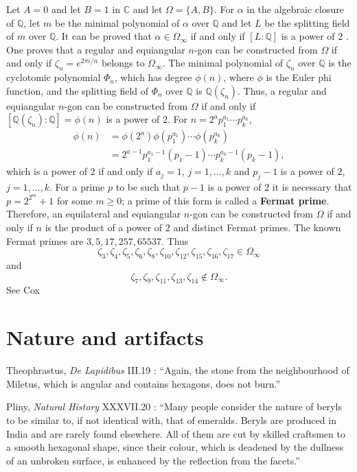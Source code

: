 \documentclass{article}
\begin{document}
Let $A=0$ and let $B=1$ in $\mathbb{C}$ and let $\Omega=\{A,B\}$. 
For $\alpha$ in the algebraic closure of $\mathbb{Q}$, let $m$ be the minimal polynomial of $\alpha$ over $\mathbb{Q}$ and let
$L$ be the splitting field of $m$ over $\mathbb{Q}$. 
It can be proved that
$\alpha \in \Omega_\infty$ if and only if $[L:\mathbb{Q}]$ is a power of $2$ \cite[p.~263, Theorem 10.1.12]{cox}.
One proves that a 
regular and equiangular $n$-gon can be constructed from $\Omega$ if and only if
$\zeta_n=e^{2\pi i/n}$ belongs to $\Omega_\infty$.
The minimal polynomial of $\zeta_n$ over $\mathbb{Q}$ is the cyclotomic polynomial
$\Phi_n$, which has degree $\phi(n)$, where $\phi$ is the Euler phi function, and the splitting field of $\Phi_n$ over $\mathbb{Q}$
is $\mathbb{Q}(\zeta_n)$. 
Thus, a regular and equiangular $n$-gon can be constructed from
$\Omega$ if and only if $[\mathbb{Q}(\zeta_n):\mathbb{Q}]=\phi(n)$ is a power of $2$.
For $n=2^{a} p_1^{a_1} \cdots p_k^{a_k}$,
\begin{align*}
\phi(n) &= \phi(2^a) \phi(p_1^{a_1}) \cdots \phi(p_k^{a_k})\\
&= 2^{a-1} p_1^{a_1-1}(p_1-1) \cdots p_k^{a_k-1} (p_k-1),
\end{align*}
which is a power of $2$ if and only if $a_j=1$, $j=1,\ldots,k$ and $p_j-1$ is a power of $2$, $j=1,\ldots,k$. 
For a prime $p$ to be such that $p-1$ is a power of $2$ it is necessary that $p=2^{2^m}+1$ for some $m \geq 0$; a prime
of this form is called a \textbf{Fermat prime}.  Therefore, an equilateral and equiangular $n$-gon can be constructed from
$\Omega$ if and only if $n$ is the product of a power of $2$ and distinct Fermat primes. 
The known Fermat primes are $3,5,17,257,65537$. Thus
\[
\zeta_3, \zeta_4, \zeta_5, \zeta_6, \zeta_8, \zeta_{10}, \zeta_{12}, \zeta_{15}, \zeta_{16}, \zeta_{17} \in \Omega_\infty
\]
and 
\[
\zeta_7, \zeta_9, \zeta_{11}, \zeta_{13}, \zeta_{14} \not \in \Omega_\infty.
\]
See Cox \cite{cox}






\section{Nature and artifacts}
Theophrastus, {\em De Lapidibus} III.19 \cite[p.~63]{theophrastus}: ``Again, the stone from the neighbourhood
of Miletus, which is angular and contains hexagons, does not burn.''

Pliny, {\em Natural History} XXXVII.20 \cite[p.~225]{LCL419}:
``Many people consider the nature of beryls to
be similar to, if not identical with, that of emeralds.
Beryls are produced in India and are rarely found
elsewhere. All of them are cut by skilled craftsmen
to a smooth hexagonal shape, since their colour,
which is deadened by the dullness of an unbroken
surface, is enhanced by the reflection from the facets.''
\end{document}
